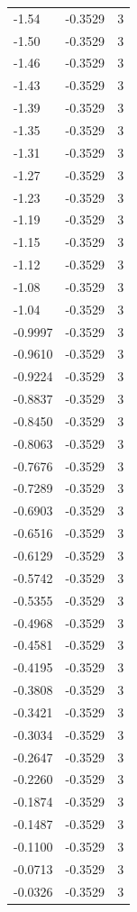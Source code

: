\begin{longtable}{lrr}
  -1.54 & -0.3529 & 3 \\
  -1.50 & -0.3529 & 3 \\
  -1.46 & -0.3529 & 3 \\
  -1.43 & -0.3529 & 3 \\
  -1.39 & -0.3529 & 3 \\
  -1.35 & -0.3529 & 3 \\
  -1.31 & -0.3529 & 3 \\
  -1.27 & -0.3529 & 3 \\
  -1.23 & -0.3529 & 3 \\
  -1.19 & -0.3529 & 3 \\
  -1.15 & -0.3529 & 3 \\
  -1.12 & -0.3529 & 3 \\
  -1.08 & -0.3529 & 3 \\
  -1.04 & -0.3529 & 3 \\
  -0.9997 & -0.3529 & 3 \\
  -0.9610 & -0.3529 & 3 \\
  -0.9224 & -0.3529 & 3 \\
  -0.8837 & -0.3529 & 3 \\
  -0.8450 & -0.3529 & 3 \\
  -0.8063 & -0.3529 & 3 \\
  -0.7676 & -0.3529 & 3 \\
  -0.7289 & -0.3529 & 3 \\
  -0.6903 & -0.3529 & 3 \\
  -0.6516 & -0.3529 & 3 \\
  -0.6129 & -0.3529 & 3 \\
  -0.5742 & -0.3529 & 3 \\
  -0.5355 & -0.3529 & 3 \\
  -0.4968 & -0.3529 & 3 \\
  -0.4581 & -0.3529 & 3 \\
  -0.4195 & -0.3529 & 3 \\
  -0.3808 & -0.3529 & 3 \\
  -0.3421 & -0.3529 & 3 \\
  -0.3034 & -0.3529 & 3 \\
  -0.2647 & -0.3529 & 3 \\
  -0.2260 & -0.3529 & 3 \\
  -0.1874 & -0.3529 & 3 \\
  -0.1487 & -0.3529 & 3 \\
  -0.1100 & -0.3529 & 3 \\
  -0.0713 & -0.3529 & 3 \\
  -0.0326 & -0.3529 & 3 \\

\end{longtable}
